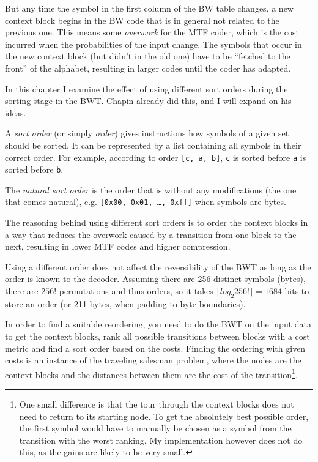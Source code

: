 \documentclass[a4paper]{scrreprt}
\begin{document}
But any time the symbol in the first column of the BW table changes, a new
context block begins in the BW code that is in general not related to the
previous one. This means some \emph{overwork} for the MTF coder, which is the
cost incurred when the probabilities of the input
change\cite{bitner1979heuristics}. The symbols that occur in the new context
block (but didn't in the old one) have to be ``fetched to the front'' of the
alphabet, resulting in larger codes until the coder has adapted.

In this chapter I examine the effect of using different sort orders during the
sorting stage in the BWT. Chapin\cite{chapin1998sort,chapin2001diss} already did
this, and I will expand on his ideas.

A \emph{sort order} (or simply \emph{order}) gives instructions how symbols of a
given set should be sorted. It can be represented by a list containing all
symbols in their correct order. For example, according to order \texttt{[c, a,
b]}, \texttt{c} is sorted before \texttt{a} is sorted before \texttt{b}.

The \emph{natural sort order} is the order that is without any modifications
(the one that comes natural), e.g. \texttt{[0x00, 0x01, \ldots, 0xff]} when
symbols are bytes.

The reasoning behind using different sort orders is to order the context blocks
in a way that reduces the overwork caused by a transition from one block to the
next, resulting in lower MTF codes and higher compression.

Using a different order does not affect the reversibility of the BWT as long as
the order is known to the decoder. Assuming there are 256 distinct symbols
(bytes), there are \(256!\) permutations and thus orders, so it takes \(\lceil
log_{2}256! \rceil = 1684\) bits to store an order (or 211 bytes, when
padding to byte boundaries).

In order to find a suitable reordering, you need to do the BWT on the input data
to get the context blocks, rank all possible transitions between blocks with a
cost metric and find a sort order based on the costs. Finding the ordering with
given costs is an instance of the traveling salesman problem, where the nodes
are the context blocks and the distances between them are the cost of the
transition\footnote{One small difference is that the tour through the context
blocks does not need to return to its starting node. To get the absolutely
best possible order, the first symbol would have to manually be chosen as a
symbol from the transition with the worst ranking. My implementation however
does not do this, as the gains are likely to be very small.}.
\end{document}
